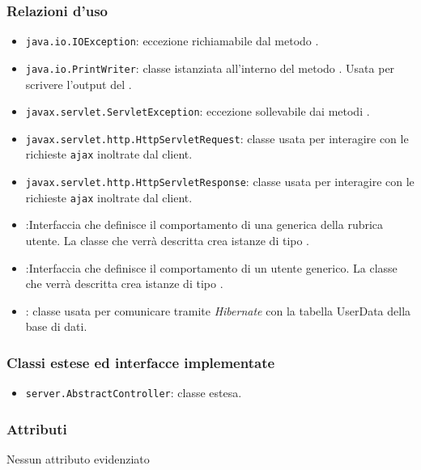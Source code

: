 \subsubsection*{Relazioni d'uso}

\begin{itemize}
	\item \texttt{java.io.IOException}: eccezione richiamabile dal metodo .
	\item \texttt{java.io.PrintWriter}: classe istanziata all'interno del metodo . Usata per scrivere l'output del .
	\item \texttt{javax.servlet.ServletException}: eccezione sollevabile dai metodi .
	\item \texttt{javax.servlet.http.HttpServletRequest}: classe usata per interagire con le richieste \texttt{ajax} inoltrate dal client.
	\item \texttt{javax.servlet.http.HttpServletResponse}: classe usata per interagire con le richieste \texttt{ajax} inoltrate dal client.
	\item {}:Interfaccia che definisce il comportamento di una generica  della rubrica utente. La classe che verrà descritta crea istanze di tipo .
	\item {}:Interfaccia che definisce il comportamento di un utente generico. La classe che verrà descritta crea istanze di tipo .
	\item {}: classe usata per comunicare tramite \textit{Hibernate} con la tabella UserData della base di dati.
\end{itemize}

\subsubsection*{Classi estese ed interfacce implementate}
\begin{itemize}
	\item \texttt{server.AbstractController}: classe estesa.
\end{itemize}

\subsubsection*{Attributi}

Nessun attributo evidenziato

